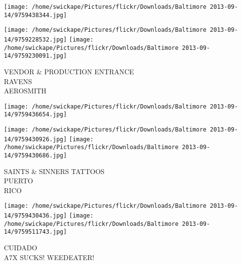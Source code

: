 \documentclass[10pt,letterpaper]{article}
\begin{document}
\texttt{[image: /home/swickape/Pictures/flickr/Downloads/Baltimore 2013-09-14/9759438344.jpg]}

\vspace{0.25in}
\texttt{[image: /home/swickape/Pictures/flickr/Downloads/Baltimore 2013-09-14/9759228532.jpg]}
\texttt{[image: /home/swickape/Pictures/flickr/Downloads/Baltimore 2013-09-14/9759230091.jpg]}

VENDOR \& PRODUCTION ENTRANCE\\
RAVENS\\
AEROSMITH\\
\pagebreak

\texttt{[image: /home/swickape/Pictures/flickr/Downloads/Baltimore 2013-09-14/9759436654.jpg]}

\vspace{0.25in}
\texttt{[image: /home/swickape/Pictures/flickr/Downloads/Baltimore 2013-09-14/9759430926.jpg]}
\texttt{[image: /home/swickape/Pictures/flickr/Downloads/Baltimore 2013-09-14/9759430686.jpg]}

SAINTS \& SINNERS TATTOOS\\
PUERTO\\
RICO\\
\pagebreak

\texttt{[image: /home/swickape/Pictures/flickr/Downloads/Baltimore 2013-09-14/9759430436.jpg]}
\texttt{[image: /home/swickape/Pictures/flickr/Downloads/Baltimore 2013-09-14/9759511743.jpg]}

CUIDADO\\
A7X SUCKS!  WEEDEATER!\\
\pagebreak
\end{document}
